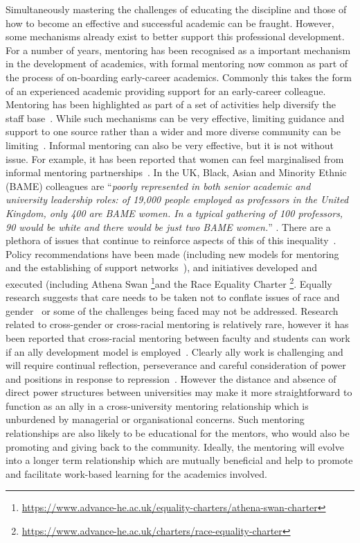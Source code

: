 \documentclass[sigconf]{acmart}
\begin{document}
Simultaneously mastering the challenges of educating the discipline and those of how to become an effective and successful academic can be fraught. However, some mechanisms already exist to better support this professional development. For a number of years, mentoring has been recognised as a important mechanism in the development of academics, with formal mentoring now common as part of the process of on-boarding early-career academics. Commonly this takes the form of an experienced academic providing support for an early-career colleague. Mentoring has been highlighted as part of a set of activities help diversify the staff base~\cite{Golubchik2018}. While such mechanisms can be very effective, limiting guidance and support to one source rather than a wider and more diverse community can be limiting~\cite{deJanasz}. Informal mentoring can also be very effective, but it is not without issue. For example, it has been reported that women can feel marginalised from informal mentoring partnerships~\cite{gibson2006mentoring}. In the UK, Black, Asian and Minority Ethnic (BAME) colleagues are ``\emph{poorly represented in both senior academic and university leadership roles: of 19,000 people employed as professors in the United Kingdom, only 400 are BAME women. In a typical gathering of 100 professors, 90 would be white and there would be just two BAME women.}'' \cite[p.~I]{UniversitiesUK19}. There are a plethora of issues that continue to reinforce aspects of this of this inequality~\cite{arday20}. Policy recommendations have been made (including new models for mentoring and the establishing of support networks~\cite{bhopal2014experiences}), and initiatives developed and executed (including Athena Swan \footnote{\url{https://www.advance-he.ac.uk/equality-charters/athena-swan-charter}}and the Race Equality Charter \footnote{\url{ https://www.advance-he.ac.uk/charters/race-equality-charter}}. Equally research suggests that care needs to be taken not to conflate issues of race and gender~\cite{Bhopal19} or some of the challenges being faced may not be addressed. Research related to cross-gender or cross-racial mentoring is relatively rare, however it has been reported that cross-racial mentoring between faculty and students can work if an ally development model is employed~\cite{reddick2016don}. Clearly ally work is challenging and will require continual reflection, perseverance and careful consideration of power and positions in response to repression~\cite{Patton2015}. However the distance and absence of direct power structures between universities may make it more straightforward to function as an ally in a cross-university mentoring relationship which is unburdened by managerial or organisational concerns. Such mentoring relationships are also likely to be educational for the mentors, who would also be promoting and giving back to the community. Ideally, the mentoring will evolve into a longer term relationship which are mutually beneficial and help to promote and facilitate work-based learning for the academics involved.
\end{document}
